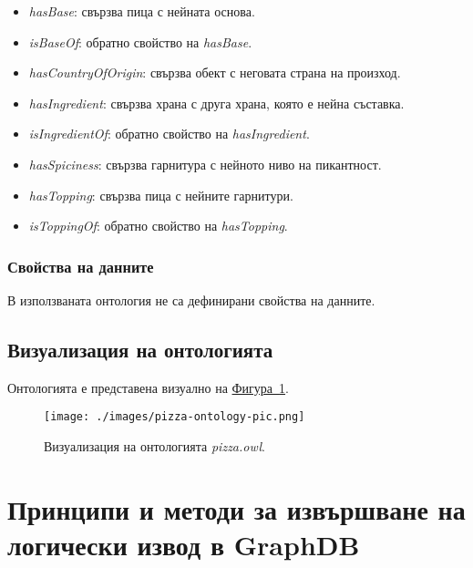 \documentclass[12pt]{article}
\begin{document}
        \begin{itemize}
            \item \textit{hasBase}: свързва пица с нейната основа.
            \item \textit{isBaseOf}: обратно свойство на \textit{hasBase}.
            \item \textit{hasCountryOfOrigin}: свързва обект с неговата страна на произход.
            \item \textit{hasIngredient}: свързва храна с друга храна, която е нейна съставка.
            \item \textit{isIngredientOf}: обратно свойство на \textit{hasIngredient}.
            \item \textit{hasSpiciness}: свързва гарнитура с нейното ниво на пикантност.
            \item \textit{hasTopping}: свързва пица с нейните гарнитури.
            \item \textit{isToppingOf}: обратно свойство на \textit{hasTopping}.
        \end{itemize}
        
        \subsubsection{Свойства на данните}

        В използваната онтология не са дефинирани свойства на данните.

    \subsection{Визуализация на онтологията}

    Онтологията е представена визуално на \hyperref[fig:pizza-ontology-pic]{Фигура~\ref*{fig:pizza-ontology-pic}}.

    \begin{center}
        \begin{figure}
        \centering
            \texttt{[image: ./images/pizza-ontology-pic.png]}
            \caption{Визуализация на онтологията \textit{pizza.owl}.}
            \label{fig:pizza-ontology-pic}
        \end{figure}
    \end{center}

\section{Принципи и методи за извършване на логически извод в GraphDB}
\end{document}
